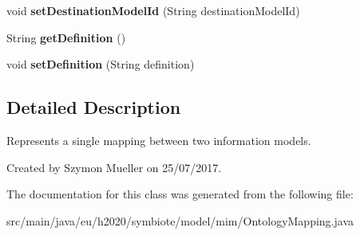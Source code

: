\begin{DoxyCompactItemize}
void {\bfseries set\+Destination\+Model\+Id} (String destination\+Model\+Id)
\item 
\mbox{\label{classeu_1_1h2020_1_1symbiote_1_1model_1_1mim_1_1OntologyMapping_a769ea505db6547c48aa2d31feaaa7e56}} 
String {\bfseries get\+Definition} ()
\item 
\mbox{\label{classeu_1_1h2020_1_1symbiote_1_1model_1_1mim_1_1OntologyMapping_af45e9b8a20fe4c9de05b3948503ef641}} 
void {\bfseries set\+Definition} (String definition)
\end{DoxyCompactItemize}


\subsection{Detailed Description}
Represents a single mapping between two information models.

Created by Szymon Mueller on 25/07/2017. 

The documentation for this class was generated from the following file\+:\begin{DoxyCompactItemize}
\item 
src/main/java/eu/h2020/symbiote/model/mim/Ontology\+Mapping.\+java\end{DoxyCompactItemize}
